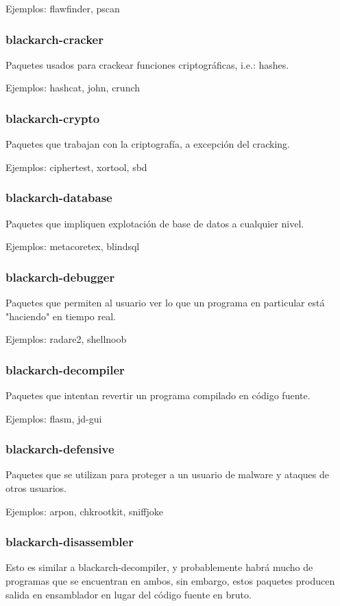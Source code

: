 \documentclass[a4paper, oneside, 11pt]{book}
\begin{document}
Ejemplos: flawfinder, pscan

\subsubsection{blackarch-cracker}
Paquetes usados para crackear funciones criptogr\'aficas, i.e.: hashes.

Ejemplos: hashcat, john, crunch

\subsubsection{blackarch-crypto}
Paquetes que trabajan con la criptograf\'ia, a excepci\'on del cracking.

Ejemplos: ciphertest, xortool, sbd

\subsubsection{blackarch-database}
Paquetes que impliquen explotaci\'on de base de datos a cualquier nivel.

Ejemplos: metacoretex, blindsql

\subsubsection{blackarch-debugger}
Paquetes que permiten al usuario ver lo que un programa en particular est\'a "haciendo" en tiempo real.

Ejemplos: radare2, shellnoob

\subsubsection{blackarch-decompiler}
Paquetes que intentan revertir un programa compilado en c\'odigo fuente.

Ejemplos: flasm, jd-gui

\subsubsection{blackarch-defensive}
Paquetes que se utilizan para proteger a un usuario de malware y ataques de otros usuarios.

Ejemplos: arpon, chkrootkit, sniffjoke

\subsubsection{blackarch-disassembler}
Esto es similar a blackarch-decompiler, y probablemente habr\'a mucho
de programas que se encuentran en ambos, sin embargo, estos paquetes producen salida en ensamblador en lugar del c\'odigo fuente en bruto.
\end{document}
